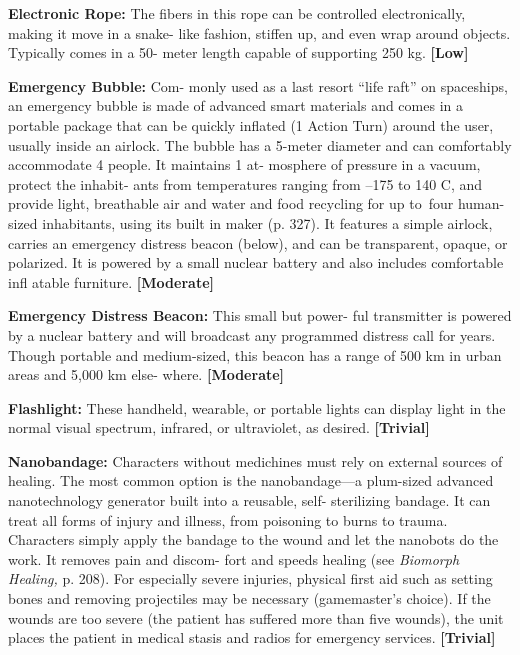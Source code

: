 \textbf{Electronic Rope:} The fibers in this rope can be 
controlled electronically, making it move in a snake-
like fashion, stiffen up, and 
even wrap around objects. 
Typically comes in a 50-
meter length capable of 
supporting 250 kg. \textbf{[Low]}

\textbf{Emergency Bubble:} Com-
monly used as a last resort 
``life raft'' on spaceships, 
an emergency bubble is 
made of advanced smart 
materials and comes in 
a portable package that 
can be quickly inflated 
(1 Action Turn) around 
the user, usually inside an 
airlock. The bubble has a 
5-meter diameter and can 
comfortably accommodate 
4 people. It maintains 1 at-
mosphere of pressure in a vacuum, protect the inhabit-
ants from temperatures ranging from –175 to 140 C, 
and provide light, breathable air and water and food 
recycling for up to four human-sized inhabitants, using 
its built in maker (p. 327). It features a simple airlock, 
carries an emergency distress beacon (below), and can 
be transparent, opaque, or polarized. It is powered by 
a small nuclear battery and also includes comfortable 
infl atable furniture. \textbf{[Moderate]}

\textbf{Emergency Distress Beacon:} This small but power-
ful transmitter is powered by a nuclear battery and 
will broadcast any programmed distress call for years. 
Though portable and medium-sized, this beacon has 
a range of 500 km in urban areas and 5,000 km else-
where. \textbf{[Moderate]}

\textbf{Flashlight:} These handheld, wearable, or portable 
lights can display light in the normal visual spectrum, 
infrared, or ultraviolet, as desired. \textbf{[Trivial]}

\textbf{Nanobandage: }Characters without medichines must 
rely on external sources of healing. The most common 
option is the nanobandage—a plum-sized advanced 
nanotechnology generator built into a reusable, self-
sterilizing bandage. It can treat all forms of injury and 
illness, from poisoning to burns to trauma. Characters 
simply apply the bandage to the wound and let the 
nanobots do the work. It removes pain and discom-
fort and speeds healing (see \textit{Biomorph Healing,} p. 
208). For especially severe injuries, physical first aid 
such as setting bones and removing projectiles may 
be necessary (gamemaster's choice). If the wounds are 
too severe (the patient has suffered more than five 
wounds), the unit places the patient in medical stasis 
and radios for emergency services. \textbf{[Trivial]}

